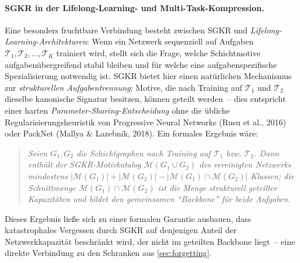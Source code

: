 \documentclass[12pt, a4paper, openany]{report}
\newcommand{\calM}{\mathcal{M}}
\begin{document}
\paragraph{SGKR in der Lifelong-Learning- und Multi-Task-Kompression.}
Eine besonders fruchtbare Verbindung besteht zwischen SGKR und
\emph{Lifelong-Learning-Architekturen}: Wenn ein Netzwerk sequenziell auf
Aufgaben $\mathcal{T}_1, \mathcal{T}_2, \ldots, \mathcal{T}_K$ trainiert
wird, stellt sich die Frage, welche Schichtmotive aufgabenübergreifend
stabil bleiben und für welche eine aufgabenspezifische Spezialisierung
notwendig ist.  SGKR bietet hier einen natürlichen Mechanismus zur
\emph{strukturellen Aufgabentrennung}: Motive, die nach Training auf
$\mathcal{T}_1$ und $\mathcal{T}_2$ dieselbe kanonische Signatur besitzen,
können geteilt werden~-- dies entspricht einer harten
\emph{Parameter-Sharing-Entscheidung} ohne die übliche Regularisierungs\-heuristik
von Progressive Neural Networks (Rusu et al., 2016) oder PackNet
(Mallya \& Lazebnik, 2018).  Ein formales Ergebnis wäre:
\begin{quote}
\textit{Seien $G_1, G_2$ die Schichtgraphen nach Training auf
$\mathcal{T}_1$ bzw. $\mathcal{T}_2$.  Dann enthält der
SGKR-Motivkatalog $\calM(G_1 \cup G_2)$ des vereinigten Netzwerks
mindestens $|\calM(G_1)| + |\calM(G_2)| - |\calM(G_1) \cap \calM(G_2)|$
Klassen; die Schnittmenge $\calM(G_1) \cap \calM(G_2)$ ist die Menge
strukturell geteilter Kapazitäten und bildet den gemeinsamen ``Backbone''
für beide Aufgaben.}
\end{quote}
Dieses Ergebnis ließe sich zu einer formalen Garantie ausbauen, dass
katastrophales Vergessen durch SGKR auf denjenigen Anteil der
Netzwerkkapazität beschränkt wird, der nicht im geteilten Backbone liegt~--
eine direkte Verbindung zu den Schranken aus \cref{sec:forgetting}.
\end{document}
